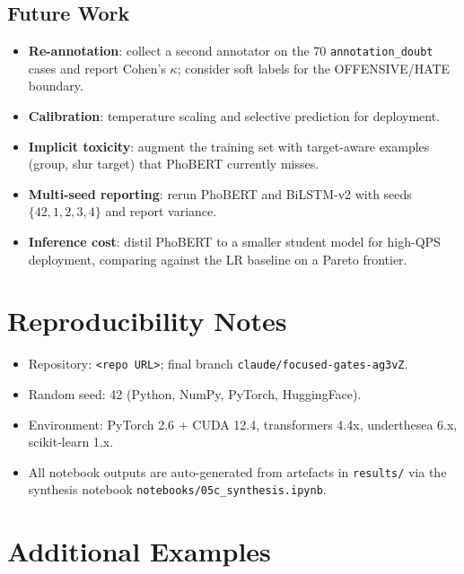 \documentclass[a4paper,12pt,oneside]{report}
\begin{document}
\section{Future Work}
\begin{itemize}
  \item \textbf{Re-annotation}: collect a second annotator on the 70
        \texttt{annotation\_doubt} cases and report Cohen's $\kappa$;
        consider soft labels for the OFFENSIVE/HATE boundary.
  \item \textbf{Calibration}: temperature scaling and selective
        prediction for deployment.
  \item \textbf{Implicit toxicity}: augment the training set with
        target-aware examples (group, slur target) that PhoBERT
        currently misses.
  \item \textbf{Multi-seed reporting}: rerun PhoBERT and BiLSTM-v2
        with seeds $\{42, 1, 2, 3, 4\}$ and report variance.
  \item \textbf{Inference cost}: distil PhoBERT to a smaller student
        model for high-QPS deployment, comparing against the LR
        baseline on a Pareto frontier.
\end{itemize}

\printbibliography[heading=bibintoc]

\appendix
\chapter{Reproducibility Notes}
\label{app:repro}
\begin{itemize}
  \item Repository: \texttt{<repo URL>}; final branch
        \texttt{claude/focused-gates-ag3vZ}.
  \item Random seed: 42 (Python, NumPy, PyTorch, HuggingFace).
  \item Environment: PyTorch 2.6 + CUDA 12.4, transformers 4.4x,
        underthesea 6.x, scikit-learn 1.x.
  \item All notebook outputs are auto-generated from artefacts in
        \texttt{results/} via the synthesis notebook
        \texttt{notebooks/05c\_synthesis.ipynb}.
\end{itemize}

\chapter{Additional Examples}
\label{app:examples}
\end{document}
